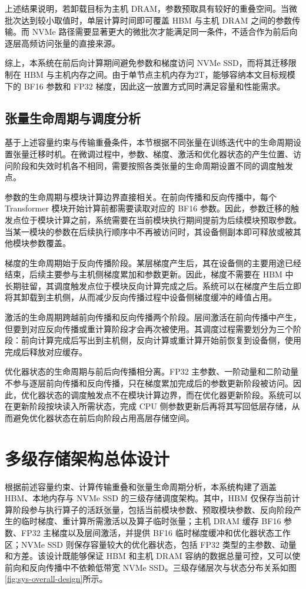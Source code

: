 \documentclass[bachelor,openany,oneside,color,AutoFakeBold=true]{buaathesis}
\begin{document}
上述结果说明，若卸载目标为主机 DRAM，参数预取具有较好的重叠空间。当微批次达到较小取值时，单层计算时间即可覆盖 HBM 与主机 DRAM 之间的参数传输。而 NVMe 路径需要显著更大的微批次才能满足同一条件，不适合作为前后向逐层高频访问张量的直接来源。

综上，本系统在前后向计算期间避免参数和梯度访问 NVMe SSD，而将其迁移限制在 HBM 与主机内存之间。由于单节点主机内存为2T，能够容纳本文目标规模下的 BF16 参数和 FP32 梯度，因此这一放置方式同时满足容量和性能需求。

\subsection{张量生命周期与调度分析}

基于上述容量约束与传输重叠条件，本节根据不同张量在训练迭代中的生命周期设置张量迁移时机。在微调过程中，参数、梯度、激活和优化器状态的产生位置、访问阶段和失效时机各不相同，需要按照各类张量的生命周期设置不同的调度触发点。

参数的生命周期与模块计算边界直接相关。在前向传播和反向传播中，每个 Transformer 模块开始计算前都需要读取对应的 BF16 参数。因此，参数迁移的触发点位于模块计算之前，系统需要在当前模块执行期间提前为后续模块预取参数。当某一模块的参数在后续执行顺序中不再被访问时，其设备侧副本即可释放或被其他模块参数覆盖。

梯度的生命周期始于反向传播阶段。某层梯度产生后，其在设备侧的主要用途已经结束，后续主要参与主机侧梯度累加和参数更新。因此，梯度不需要在 HBM 中长期驻留，其调度触发点位于模块反向计算完成之后。系统可以在梯度产生后立即将其卸载到主机侧，从而减少反向传播过程中设备侧梯度缓冲的峰值占用。

激活的生命周期跨越前向传播和反向传播两个阶段。层间激活在前向传播中产生，但要到对应反向传播或重计算阶段才会再次被使用。其调度过程需要划分为三个阶段：前向计算完成后写出到主机侧，反向计算或重计算开始前恢复到设备侧，使用完成后释放对应缓存。

优化器状态的生命周期与前后向传播相分离。FP32 主参数、一阶动量和二阶动量不参与逐层前向传播和反向传播，只在梯度累加完成后的参数更新阶段被访问。因此，优化器状态的调度触发点不在模块计算边界，而在优化器更新阶段。系统可以在更新阶段按块读入所需状态，完成 CPU 侧参数更新后再将其写回低层存储，从而避免优化器状态在前后向阶段占用高层存储空间。


\section{多级存储架构总体设计}
根据前述容量约束、计算传输重叠和张量生命周期分析，本系统构建了涵盖 HBM、本地内存与 NVMe SSD 的三级存储调度架构。其中，HBM 仅保存当前计算阶段参与执行算子的活跃张量，包括当前模块参数、预取模块参数、反向阶段产生的临时梯度、重计算所需激活以及算子临时张量；主机 DRAM 缓存 BF16 参数、FP32 主梯度以及层间激活，并提供 BF16 临时梯度缓冲和优化器状态工作区；NVMe SSD 则保存容量较大的优化器状态，包括 FP32 类型的主参数、动量和方差。该设计既能够保证 HBM 和主机 DRAM 容纳的数据总量可控，又可以使前向和反向传播中不依赖低带宽 NVMe SSD。三级存储层次与状态分布关系如图\ref{fig:sys-overall-design}所示。
\end{document}
